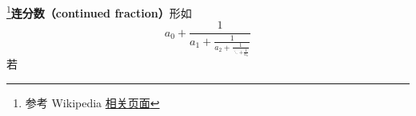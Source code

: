 
\footnote{参考 Wikipedia \href{https://en.wikipedia.org/wiki/Continued_fraction}{相关页面}}\textbf{连分数（continued fraction）}形如
\begin{equation}
a_0 + \frac{1}{\displaystyle a_1 + \frac{1}{\displaystyle a_2 + \frac{1}{\displaystyle \ddots + \frac{1}{a_n}}}}
\end{equation}
若
